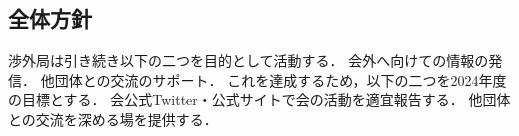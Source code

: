 \subsection*{全体方針}



渉外局は引き続き以下の二つを目的として活動する．
    会外へ向けての情報の発信．
    他団体との交流のサポート．
これを達成するため，以下の二つを2024年度の目標とする．
    会公式Twitter・公式サイトで会の活動を適宜報告する．
    他団体との交流を深める場を提供する．




